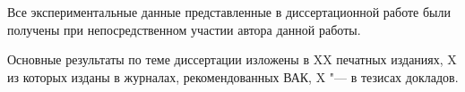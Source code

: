 {\contribution} Все экспериментальные данные представленные в диссертационной работе были получены при непосредственном участии автора данной работы.


     Основные результаты по теме диссертации изложены в XX печатных изданиях, 
    X из которых изданы в журналах, рекомендованных ВАК, 
    X "--- в тезисах докладов.%
    

